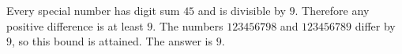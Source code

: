 Every special number has digit sum $45$ and is divisible by $9$. Therefore any positive difference is at least $9$. The numbers $123456798$ and $123456789$ differ by $9$, so this bound is attained. The answer is $\boxed9$.
